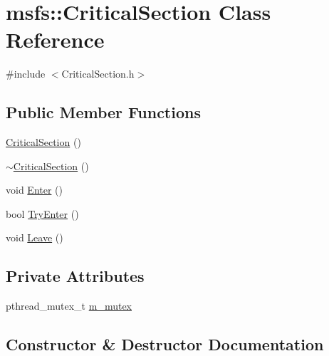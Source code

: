 \hypertarget{classmsfs_1_1_critical_section}{}\section{msfs\+:\+:Critical\+Section Class Reference}
\label{classmsfs_1_1_critical_section}


{\ttfamily \#include $<$Critical\+Section.\+h$>$}

\subsection*{Public Member Functions}
\begin{DoxyCompactItemize}
\item 
\hyperlink{classmsfs_1_1_critical_section_a463d347487fc3c3751c3b0df3de75258}{Critical\+Section} ()
\item 
\hyperlink{classmsfs_1_1_critical_section_a651689f6308950569fe4c278db83276e}{$\sim$\+Critical\+Section} ()
\item 
void \hyperlink{classmsfs_1_1_critical_section_a4399ae1241ca91e10153344f7564a4dd}{Enter} ()
\item 
bool \hyperlink{classmsfs_1_1_critical_section_a1447fcb8b26948b5eeb177a5c5a43889}{Try\+Enter} ()
\item 
void \hyperlink{classmsfs_1_1_critical_section_af316be9777c705bb7d70f4bfcfb7a0b3}{Leave} ()
\end{DoxyCompactItemize}
\subsection*{Private Attributes}
\begin{DoxyCompactItemize}
\item 
pthread\+\_\+mutex\+\_\+t \hyperlink{classmsfs_1_1_critical_section_a0d8170a4f69f4e968e46db9dae3d39bf}{m\+\_\+mutex}
\end{DoxyCompactItemize}


\subsection{Constructor \& Destructor Documentation}
\hypertarget{classmsfs_1_1_critical_section_a463d347487fc3c3751c3b0df3de75258}{}
